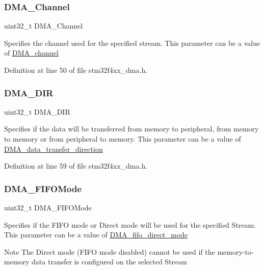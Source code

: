 \subsubsection{\texorpdfstring{D\+M\+A\+\_\+\+Channel}{DMA\_Channel}}
{\footnotesize\ttfamily uint32\+\_\+t D\+M\+A\+\_\+\+Channel}

Specifies the channel used for the specified stream. This parameter can be a value of \hyperlink{group___d_m_a__channel}{D\+M\+A\+\_\+channel} 

Definition at line 50 of file stm32f4xx\+\_\+dma.\+h.

\mbox{\label{struct_d_m_a___init_type_def_a4cf4283185065f65d5a63089877cbb8d}} 
\subsubsection{\texorpdfstring{D\+M\+A\+\_\+\+D\+IR}{DMA\_DIR}}
{\footnotesize\ttfamily uint32\+\_\+t D\+M\+A\+\_\+\+D\+IR}

Specifies if the data will be transferred from memory to peripheral, from memory to memory or from peripheral to memory. This parameter can be a value of \hyperlink{group___d_m_a__data__transfer__direction}{D\+M\+A\+\_\+data\+\_\+transfer\+\_\+direction} 

Definition at line 59 of file stm32f4xx\+\_\+dma.\+h.

\mbox{\label{struct_d_m_a___init_type_def_a684555f9f5644259b7c4ca446b6dcf8f}} 
\subsubsection{\texorpdfstring{D\+M\+A\+\_\+\+F\+I\+F\+O\+Mode}{DMA\_FIFOMode}}
{\footnotesize\ttfamily uint32\+\_\+t D\+M\+A\+\_\+\+F\+I\+F\+O\+Mode}

Specifies if the F\+I\+FO mode or Direct mode will be used for the specified Stream. This parameter can be a value of \hyperlink{group___d_m_a__fifo__direct__mode}{D\+M\+A\+\_\+fifo\+\_\+direct\+\_\+mode} \begin{DoxyNote}{Note}
The Direct mode (F\+I\+FO mode disabled) cannot be used if the memory-\/to-\/memory data transfer is configured on the selected Stream 
\end{DoxyNote}


